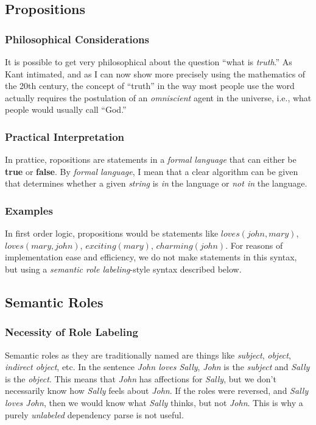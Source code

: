 \documentclass[12pt]{article}
\begin{document}
\subsection{Propositions}
\subsubsection{Philosophical Considerations}
It is possible to get very philosophical about the question ``what is {\em truth}.''
As Kant intimated, and as I can now show more precisely using the mathematics of the 20th century, the concept of ``truth'' in the way most people use the word actually requires the postulation of an {\em omniscient} agent in the universe, i.e., what people would usually call ``God.''
\subsubsection{Practical Interpretation}
In prattice, ropositions are statements in a {\em formal language} that can either be {\bf true} or {\bf false}.
By {\em formal language}, I mean that a clear algorithm can be given that determines whether a given {\em string} is {\em in} the language or {\em not in} the language.
\subsubsection{Examples}
In first order logic, propositions would be statements like $loves(john, mary)$, $loves(mary, john)$, $exciting(mary)$, $charming(john)$.
For reasons of implementation ease and efficiency, we do not make statements in this syntax, but using a {\em semantic role labeling}-style syntax described below.
\subsection{Semantic Roles}
\subsubsection{Necessity of Role Labeling}
Semantic roles as they are traditionally named are things like {\em subject}, {\em object}, {\em indirect object}, etc.
In the sentence {\em John loves Sally}, {\em John} is the {\em subject} and {\em Sally} is the {\em object}.
This means that {\em John} has affections for {\em Sally}, but we don't necessarily know how {\em Sally} feels about {\em John}.
If the roles were reversed, and {\em Sally loves John}, then we would know what {\em Sally} thinks, but not {\em John}.
This is why a purely {\em unlabeled} dependency parse is not useful.
\end{document}
